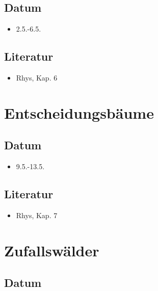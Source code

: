 \documentclass[
]{book}
\providecommand{\tightlist}{%
  \setlength{\itemsep}{0pt}\setlength{\parskip}{0pt}}
\begin{document}
\hypertarget{datum-7}{%
\subsection{Datum}\label{datum-7}}

\begin{itemize}
\tightlist
\item
  2.5.-6.5.
\end{itemize}

\hypertarget{literatur-7}{%
\subsection{Literatur}\label{literatur-7}}

\begin{itemize}
\tightlist
\item
  Rhys, Kap. 6
\end{itemize}

\hypertarget{entscheidungsbuxe4ume}{%
\section{Entscheidungsbäume}\label{entscheidungsbuxe4ume}}

\hypertarget{datum-8}{%
\subsection{Datum}\label{datum-8}}

\begin{itemize}
\tightlist
\item
  9.5.-13.5.
\end{itemize}

\hypertarget{literatur-8}{%
\subsection{Literatur}\label{literatur-8}}

\begin{itemize}
\tightlist
\item
  Rhys, Kap. 7
\end{itemize}

\hypertarget{zufallswuxe4lder}{%
\section{Zufallswälder}\label{zufallswuxe4lder}}

\hypertarget{datum-9}{%
\subsection{Datum}\label{datum-9}}
\end{document}
